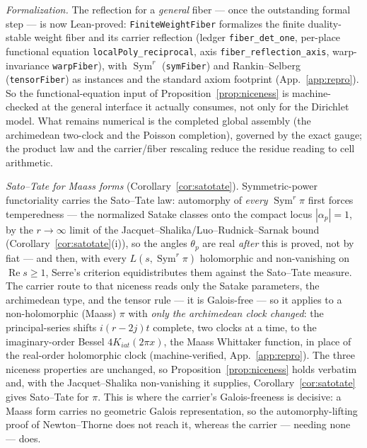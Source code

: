 \documentclass[11pt]{article}
\theoremstyle{definition}
\renewcommand{\Re}{\operatorname{Re}}
\newcommand{\Sym}{\operatorname{Sym}}
\begin{document}
\emph{Formalization.} The reflection for a \emph{general} fiber --- once the outstanding formal step ---
is now Lean-proved: \texttt{FiniteWeightFiber} formalizes the finite duality-stable weight fiber and its
carrier reflection (ledger \texttt{fiber\_det\_one}, per-place functional equation
\texttt{localPoly\_reciprocal}, axis \texttt{fiber\_reflection\_axis}, warp-invariance
\texttt{warpFiber}), with $\Sym^r$ (\texttt{symFiber}) and Rankin--Selberg (\texttt{tensorFiber}) as
instances and the standard axiom footprint (App.~\ref{app:repro}).  So the functional-equation input of
Proposition~\ref{prop:niceness} is machine-checked at the general interface it actually consumes, not
only for the Dirichlet model.  What remains numerical is the completed global assembly (the archimedean
two-clock and the Poisson completion), governed by the exact gauge; the product law and the
carrier/fiber rescaling reduce the residue reading to cell arithmetic.

\emph{Sato--Tate for Maass forms} (Corollary~\ref{cor:satotate}). Symmetric-power functoriality carries
the Sato--Tate law: automorphy of \emph{every} $\Sym^r\pi$ first forces temperedness --- the normalized
Satake classes onto the compact locus $|\alpha_p|=1$, by the $r\to\infty$ limit of the
Jacquet--Shalika/Luo--Rudnick--Sarnak bound (Corollary~\ref{cor:satotate}(i)), so the angles $\theta_p$ are
real \emph{after} this is proved, not by fiat --- and then, with every $L(s,\Sym^r\pi)$ holomorphic and
non-vanishing on $\Re s\ge1$, Serre's criterion \cite{Serre} equidistributes them against the Sato--Tate
measure. The carrier
route to that niceness reads only the Satake parameters, the archimedean type, and the tensor rule --- it
is Galois-free --- so it applies to a non-holomorphic (Maass) $\pi$ with \emph{only the archimedean clock
changed}: the principal-series shifts $i(r-2j)t$ complete, two clocks at a time, to the imaginary-order
Bessel $4K_{iat}(2\pi x)$, the Maass Whittaker function, in place of the real-order holomorphic clock
(machine-verified, App.~\ref{app:repro}). The three niceness properties are unchanged, so
Proposition~\ref{prop:niceness} holds verbatim and, with the Jacquet--Shalika \cite{JS} non-vanishing it
supplies, Corollary~\ref{cor:satotate} gives Sato--Tate for $\pi$. This is where the carrier's
Galois-freeness is decisive: a Maass form carries no geometric Galois representation, so the
automorphy-lifting proof of Newton--Thorne \cite{NT} does not reach it, whereas the carrier --- needing
none --- does.
\end{document}
